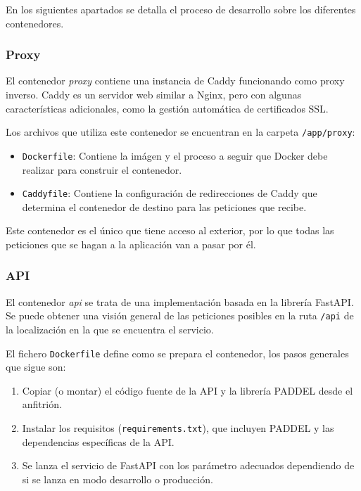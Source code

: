 En los siguientes apartados se detalla el proceso de desarrollo sobre los
diferentes contenedores.

\subsubsection{Proxy}

El contenedor \textit{proxy} contiene una instancia de Caddy funcionando como
proxy inverso. Caddy es un servidor web similar a Nginx, pero con algunas
características adicionales, como la gestión automática de certificados SSL.

Los archivos que utiliza este contenedor se encuentran en la carpeta
\texttt{/app/proxy}:

\begin{itemize}
    \item \texttt{Dockerfile}: Contiene la imágen y el proceso a seguir que
          Docker debe realizar para construir el contenedor.
    \item \texttt{Caddyfile}: Contiene la configuración de redirecciones de
          Caddy que determina el contenedor de destino para las peticiones que
          recibe.
\end{itemize}

Este contenedor es el único que tiene acceso al exterior, por lo que todas las
peticiones que se hagan a la aplicación van a pasar por él.

\subsubsection{API}

El contenedor \textit{api} se trata de una implementación basada en la librería
FastAPI. Se puede obtener una visión general de las peticiones posibles en la
ruta \texttt{/api} de la localización en la que se encuentra el servicio.

El fichero \texttt{Dockerfile} define como se prepara el contenedor, los pasos
generales que sigue son:

\begin{enumerate}
    \item Copiar (o montar) el código fuente de la API y la librería PADDEL
          desde el anfitrión.
    \item Instalar los requisitos (\texttt{requirements.txt}), que incluyen
          PADDEL y las dependencias específicas de la API.
    \item Se lanza el servicio de FastAPI con los parámetro adecuados
          dependiendo de si se lanza en modo desarrollo o producción.
\end{enumerate}

